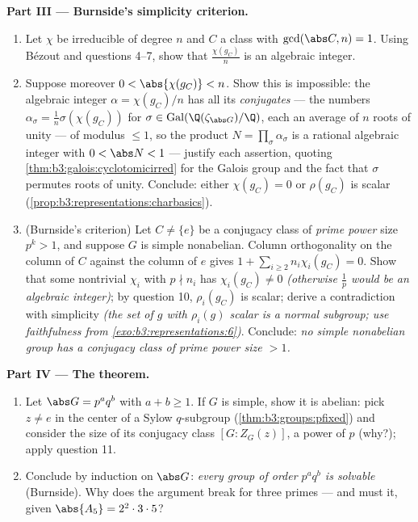 \begin{problem}
\medskip
\noindent\textbf{Part III --- Burnside's simplicity criterion.}
\begin{enumerate}[resume]
  \item Let $\chi$ be irreducible of degree $n$ and $C$ a class
        with $\gcd(\abs C, n) = 1$. Using B\'ezout and questions
        4--7, show that $\frac{\chi(g_C)}{n}$ is an algebraic
        integer.
  \item Suppose moreover $0 < \abs{\chi(g_C)} < n$. Show this is
        impossible: the algebraic integer $\alpha =
        \chi(g_C)/n$ has all its \emph{conjugates} --- the
        numbers $\alpha_\sigma = \frac1n\sigma(\chi(g_C))$ for
        $\sigma \in \operatorname{Gal}(\Q(\zeta_{\abs G})/\Q)$,
        each an average of $n$ roots of unity --- of modulus
        $\leq 1$,
        so the product $N = \prod_\sigma\alpha_\sigma$ is a
        rational algebraic integer with $0 < \abs N < 1$ ---
        justify each assertion, quoting
        \cref{thm:b3:galois:cyclotomicirred} for the Galois
        group and the fact that $\sigma$ permutes roots of
        unity. Conclude: either $\chi(g_C) = 0$ or $\rho(g_C)$
        is scalar (\cref{prop:b3:representations:charbasics}).
  \item (Burnside's criterion) Let $C \neq \{e\}$ be a
        conjugacy class of \emph{prime power} size $p^k > 1$,
        and suppose $G$ is simple nonabelian. Column
        orthogonality on the column of $C$ against the column of
        $e$ gives $1 + \sum_{i \geq 2} n_i\chi_i(g_C) = 0$. Show
        that some nontrivial $\chi_i$ with $p \nmid n_i$ has
        $\chi_i(g_C) \neq 0$ \emph{(otherwise $\frac1p$ would be
        an algebraic integer)}; by question 10, $\rho_i(g_C)$
        is scalar; derive a contradiction with simplicity
        \emph{(the set of $g$ with $\rho_i(g)$ scalar is a
        normal subgroup; use faithfulness from
        \cref{exo:b3:representations:6})}. Conclude: \emph{no
        simple nonabelian group has a conjugacy class of prime
        power size $> 1$.}
\end{enumerate}

\medskip
\noindent\textbf{Part IV --- The theorem.}
\begin{enumerate}[resume]
  \item Let $\abs G = p^aq^b$ with $a + b \geq 1$. If $G$ is
        simple, show it is abelian: pick $z \neq e$ in the
        center of a Sylow $q$-subgroup
        (\cref{thm:b3:groups:pfixed}) and consider the size of
        its conjugacy class $[G : Z_G(z)]$, a power of $p$
        (why?); apply question 11.
  \item Conclude by induction on $\abs G$: \emph{every group of
        order $p^aq^b$ is solvable} (Burnside). Why does the
        argument break for three primes --- and must it, given
        $\abs{A_5} = 2^2\cdot3\cdot5$?
\end{enumerate}


\end{problem}
